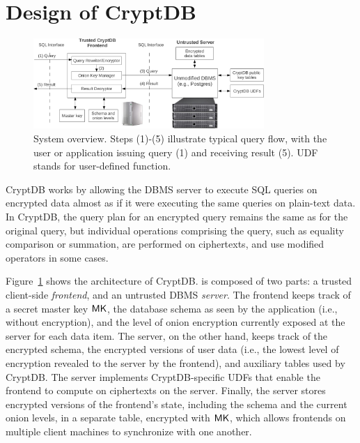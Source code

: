 \section{Design of CryptDB}
\label{s:design}


\begin{figure}[t!]
\centering
\includegraphics[width=3.45in]{fig/systemoverview.pdf}
\caption{System overview.
    Steps (1)-(5) illustrate typical query flow, with the user or
    application issuing query (1) and receiving result (5).
    UDF stands for user-defined function.}
\label{fig:architecture}
\end{figure}


CryptDB works by allowing the DBMS server to execute SQL queries
on encrypted data almost as if it were executing the same queries
on plain-text data.  In CryptDB, the query plan for an encrypted
query remains the same as for the original query, but individual
operations comprising the query, such as equality comparison or
summation, are performed on ciphertexts, and use modified operators
in some cases.

Figure~\ref{fig:architecture} shows the architecture of CryptDB\@.
\name{} is composed of two parts: a trusted client-side \textit{frontend},
and an untrusted DBMS {\em server}.  The frontend keeps track of a secret
master key $\mathsf{MK}$, the database schema as seen by the application (i.e.,
without encryption), and the level of onion encryption currently exposed
at the server for each data item.  The server, on the other hand,
keeps track of the encrypted schema, the encrypted versions of user data
(i.e., the lowest level of encryption revealed to the server by the
frontend), and auxiliary tables used by CryptDB\@.  The server implements
CryptDB-specific UDFs that enable the
frontend to compute on ciphertexts on the server.  Finally, the server
stores encrypted versions of the frontend's state, including the schema
and the current onion levels, in a separate table, encrypted with $\mathsf{MK}$,
which allows frontends on multiple client machines to synchronize with
one another.


